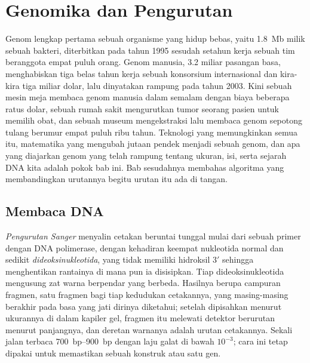\chapter{Genomika dan Pengurutan}\label{ch:b3:genomics}

Genom lengkap pertama sebuah organisme yang hidup bebas, yaitu \qty{1.8}{Mb}
milik sebuah bakteri, diterbitkan pada tahun 1995 sesudah setahun kerja sebuah
tim beranggota empat puluh orang. Genom manusia, \num{3.2} miliar pasangan
basa, menghabiskan tiga belas tahun kerja sebuah konsorsium internasional dan
kira-kira tiga miliar dolar, lalu dinyatakan rampung pada tahun 2003. Kini
sebuah mesin meja membaca genom manusia dalam semalam dengan biaya beberapa
ratus dolar, sebuah rumah sakit mengurutkan tumor seorang pasien untuk memilih
obat, dan sebuah museum mengekstraksi lalu membaca genom sepotong tulang
berumur empat puluh ribu tahun. Teknologi yang memungkinkan semua itu,
matematika yang mengubah jutaan  pendek menjadi sebuah genom, dan apa
yang diajarkan genom yang telah rampung tentang ukuran, isi, serta sejarah DNA
kita adalah pokok bab ini. Bab sesudahnya membahas algoritma yang
membandingkan urutannya begitu urutan itu ada di tangan.

\section{Membaca DNA}

\begin{definition}\label{def:b3:genomics:sanger}
\emph{Pengurutan Sanger} menyalin cetakan beruntai tunggal mulai dari sebuah
primer dengan DNA polimerase, dengan kehadiran keempat nukleotida normal dan
sedikit \emph{dideoksinukleotida}, yang tidak memiliki hidroksil 3$'$ sehingga
menghentikan rantainya di mana pun ia disisipkan. Tiap dideoksinukleotida
mengusung zat warna berpendar yang berbeda. Hasilnya berupa campuran fragmen,
satu fragmen bagi tiap kedudukan cetakannya, yang masing-masing berakhir pada
basa yang jati dirinya diketahui; setelah dipisahkan menurut ukurannya di
dalam kapiler gel, fragmen itu melewati detektor berurutan menurut panjangnya,
dan deretan warnanya adalah urutan cetakannya. Sekali jalan terbaca
\qtyrange{700}{900}{bp} dengan laju galat di bawah $10^{-3}$; cara ini tetap
dipakai untuk memastikan sebuah konstruk atau satu gen.
\end{definition}

